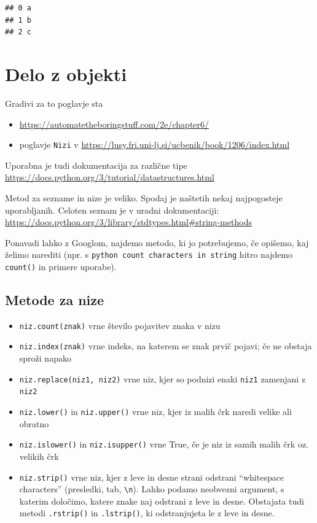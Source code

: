 \documentclass[
]{report}
\providecommand{\tightlist}{%
  \setlength{\itemsep}{0pt}\setlength{\parskip}{0pt}}
\begin{document}
\begin{verbatim}
## 0 a
## 1 b
## 2 c
\end{verbatim}

\hypertarget{delo-z-objekti}{%
\chapter{Delo z objekti}\label{delo-z-objekti}}

Gradivi za to poglavje sta

\begin{itemize}
\tightlist
\item
  \url{https://automatetheboringstuff.com/2e/chapter6/}
\item
  poglavje \texttt{Nizi} v \url{https://lusy.fri.uni-lj.si/ucbenik/book/1206/index.html}
\end{itemize}

Uporabna je tudi dokumentacija za različne tipe \url{https://docs.python.org/3/tutorial/datastructures.html}

Metod za sezname in nize je veliko. Spodaj je naštetih nekaj najpogosteje uporabljanih. Celoten seznam je v uradni dokumentaciji: \url{https://docs.python.org/3/library/stdtypes.html\#string-methods}

Ponavadi lahko z Googlom, najdemo metodo, ki jo potrebujemo, če opišemo, kaj želimo
narediti (npr. s \texttt{python\ count\ characters\ in\ string} hitro najdemo \texttt{count()} in primere uporabe).

\hypertarget{metode-za-nize}{%
\section{Metode za nize}\label{metode-za-nize}}

\begin{itemize}
\tightlist
\item
  \texttt{niz.count(znak)} vrne število pojavitev znaka v nizu
\item
  \texttt{niz.index(znak)} vrne indeks, na katerem se znak prvič pojavi; če ne obstaja sproži napako
\item
  \texttt{niz.replace(niz1,\ niz2)} vrne niz, kjer so podnizi enaki \texttt{niz1} zamenjani z \texttt{niz2}
\item
  \texttt{niz.lower()} in \texttt{niz.upper()} vrne niz, kjer iz malih črk naredi velike ali obratno
\item
  \texttt{niz.islower()} in \texttt{niz.isupper()} vrne True, če je niz iz samih malih črk oz. velikih črk
\item
  \texttt{niz.strip()} vrne niz, kjer z leve in desne strani odstrani ``whitespace characters'' (presledki, tab, \texttt{\textbackslash{}n}). Lahko podamo neobvezni argument, s katerim določimo, katere znake
  naj odstrani z leve in desne. Obstajata tudi metodi \texttt{.rstrip()} in \texttt{.lstrip()}, ki odstranjujeta le z leve in desne.
\end{itemize}
\end{document}
